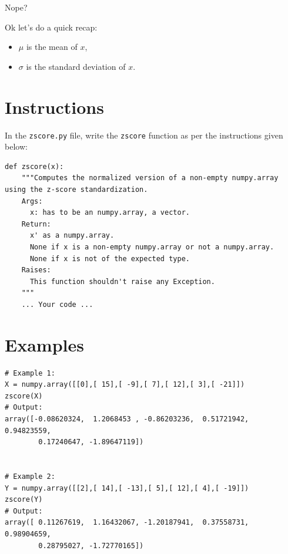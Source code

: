\documentclass{42-en}
\begin{document}
Nope?

Ok let's do a quick recap:
\begin{itemize}
  \item $\mu$ is the mean of $x$,
  \item $\sigma$ is the standard deviation of $x$.
\end{itemize}

\section*{Instructions}
In the \texttt{zscore.py} file, write the \texttt{zscore} function as per the instructions given below:

\begin{verbatim}
def zscore(x):
    """Computes the normalized version of a non-empty numpy.array using the z-score standardization.
    Args:
      x: has to be an numpy.array, a vector.
    Return:
      x' as a numpy.array. 
      None if x is a non-empty numpy.array or not a numpy.array.
      None if x is not of the expected type.
    Raises:
      This function shouldn't raise any Exception.
    """
    ... Your code ...
\end{verbatim}


\section*{Examples}
\begin{verbatim}
# Example 1:
X = numpy.array([[0],[ 15],[ -9],[ 7],[ 12],[ 3],[ -21]])
zscore(X)
# Output:
array([-0.08620324,  1.2068453 , -0.86203236,  0.51721942,  0.94823559,
        0.17240647, -1.89647119])


# Example 2:
Y = numpy.array([[2],[ 14],[ -13],[ 5],[ 12],[ 4],[ -19]])
zscore(Y)
# Output:
array([ 0.11267619,  1.16432067, -1.20187941,  0.37558731,  0.98904659,
        0.28795027, -1.72770165])
\end{verbatim}



\newpage

\end{document}

